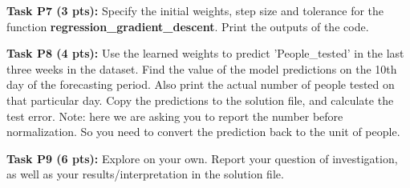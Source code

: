 \documentclass[12pt]{article}
\begin{document}
\textbf{Task P7 (3 pts):} Specify the initial weights, step size and tolerance for the function \textbf{regression\_gradient\_descent}. Print the outputs of the code.

\textbf{Task P8 (4 pts):} Use the learned weights to predict 'People\_tested' in the last three weeks in the dataset. Find the value of the model predictions on the 10th day of the forecasting period. Also print the actual number of people tested on that particular day. Copy the predictions to the solution file, and calculate the test error. Note: here we are asking you to report the number before normalization. So you need to convert the prediction back to the unit of people.

\textbf{Task P9 (6 pts):} Explore on your own. Report your question of investigation, as well as your results/interpretation in the solution file.
\end{document}
